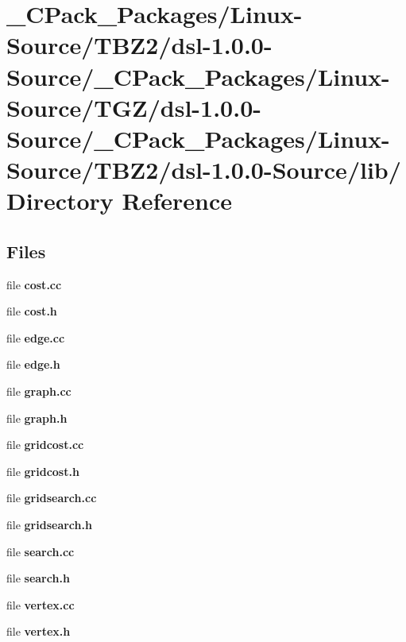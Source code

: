 \section{\_\-CPack\_\-Packages/Linux-\/Source/TBZ2/dsl-\/1.0.0-\/Source/\_\-CPack\_\-Packages/Linux-\/Source/TGZ/dsl-\/1.0.0-\/Source/\_\-CPack\_\-Packages/Linux-\/Source/TBZ2/dsl-\/1.0.0-\/Source/lib/ Directory Reference}
\label{dir_5d943a6c7832bff383854aa6f5802959}
\subsection*{Files}
\begin{DoxyCompactItemize}
\item 
file {\bf cost.cc}
\item 
file {\bf cost.h}
\item 
file {\bf edge.cc}
\item 
file {\bf edge.h}
\item 
file {\bf graph.cc}
\item 
file {\bf graph.h}
\item 
file {\bf gridcost.cc}
\item 
file {\bf gridcost.h}
\item 
file {\bf gridsearch.cc}
\item 
file {\bf gridsearch.h}
\item 
file {\bf search.cc}
\item 
file {\bf search.h}
\item 
file {\bf vertex.cc}
\item 
file {\bf vertex.h}
\end{DoxyCompactItemize}
